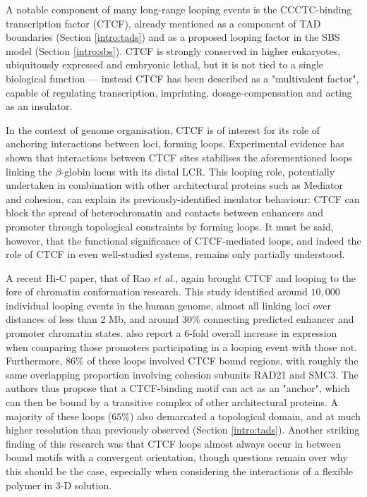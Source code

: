 \documentclass[a4paper,11pt,oneside]{book}
\begin{document}
A notable component of many long-range looping events is the CCCTC-binding transcription factor (CTCF),\cite{Ong2014, Phillips2009, Handoko2011} already mentioned as a component of TAD boundaries (Section \ref{intro:tads}) and as a proposed looping factor in the SBS model (Section \ref{intro:sbs}). CTCF is strongly conserved in higher eukaryotes,\cite{Filippova1996a} ubiquitously expressed and embryonic lethal, but it is not tied to a single biological function --- instead CTCF has been described as a "multivalent factor",\cite{Phillips2009} capable of regulating transcription, imprinting, dosage-compensation and acting as an insulator. 

In the context of genome organisation, CTCF is of interest for its role of anchoring interactions between loci, forming loops. Experimental evidence has shown that interactions between CTCF sites stabilises the aforementioned loops linking the $\beta$-globin locus with its distal LCR.\cite{Splinter2006} This looping role, potentially undertaken in combination with other architectural proteins such as Mediator and cohesion,\cite{Phillips-Cremins2013, Sexton2009} can explain its previously-identified insulator behaviour: CTCF can block the spread of heterochromatin and contacts between enhancers and promoter through topological constraints by forming loops.\cite{Phillips2009} It must be said, however, that the functional significance of CTCF-mediated loops, and indeed the role of CTCF in even well-studied systems, remains only partially understood.\cite{Gomez-Diaz2014}

A recent Hi-C paper, that of Rao \emph{et al.},\cite{Rao2014} again brought CTCF and looping to the fore of chromatin conformation research. This study identified around $10,000$ individual looping events in the human genome, almost all linking loci over distances of less than 2 Mb, and around $30\%$ connecting predicted enhancer and promoter chromatin states. \citet{Rao2014} also report a 6-fold overall increase in expression when comparing those promoters participating in a looping event with those not. Furthermore, $86\%$ of these loops involved CTCF bound regions, with roughly the same overlapping proportion involving cohesion subunits RAD21 and SMC3. The authors thus propose that a CTCF-binding motif can act as an "anchor", which can then be bound by a transitive complex of other architectural proteins.\cite{Rao2014} A majority of these loops ($65\%$) also demarcated a topological domain, and at much higher resolution than previously observed (Section \ref{intro:tads}). Another striking finding of this research was that CTCF loops almost always occur in between bound motifs with a convergent orientation,\cite{Rao2014} though questions remain over why this should be the case, especially when considering the interactions of a flexible polymer in 3-D solution.\cite{Nichols2015}
\end{document}
